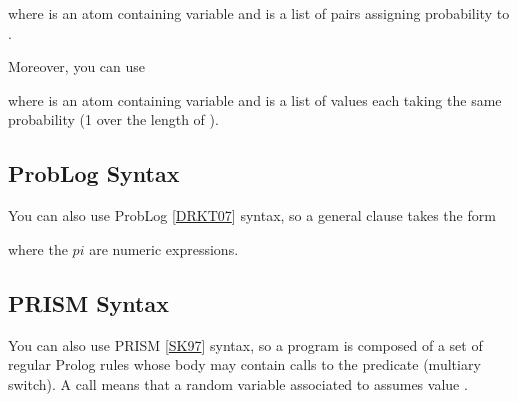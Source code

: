 \documentclass[letterpaper,10pt,english]{sphinxmanual}
\begin{document}
\sphinxAtStartPar
where  is an atom containing variable  and  is a list of pairs  assigning probability  to .

\sphinxAtStartPar
Moreover, you can use

\begin{sphinxVerbatim}[commandchars=\\\{\}]
\end{sphinxVerbatim}

\sphinxAtStartPar
where  is an atom containing variable  and  is a list of values each taking the same probability (1 over the length of ).


\subsection{ProbLog Syntax}
\label{\detokenize{index:problog-syntax}}
\sphinxAtStartPar
You can also use ProbLog {[}\hyperlink{cite.index:id47}{DRKT07}{]} syntax, so a general clause takes the form

\begin{sphinxVerbatim}[commandchars=\\\{\}]
      
\end{sphinxVerbatim}

\sphinxAtStartPar
where the \(pi\) are numeric expressions.


\subsection{PRISM Syntax}
\label{\detokenize{index:prism-syntax}}
\sphinxAtStartPar
You can also use PRISM {[}\hyperlink{cite.index:id48}{SK97}{]} syntax, so a program is composed of a set of regular Prolog rules whose body may contain calls to the  predicate (multi\sphinxhyphen{}ary switch).
A call  means that a random variable associated to  assumes value .
\end{document}
